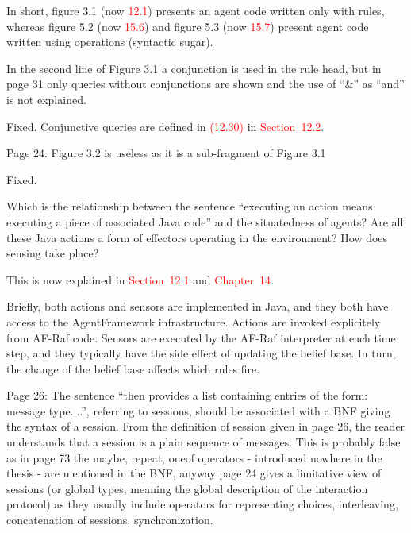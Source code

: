\documentclass{article}
\newcommand*\R[1]{\textcolor{red}{#1}} %
\newenvironment{them}{\noindent\begingroup\color{blue}}{\endgroup\par}
\begin{document}
In short, figure 3.1 (now \R{12.1}) presents an agent code written only with
rules, whereas figure 5.2 (now \R{15.6}) and figure 5.3 (now \R{15.7}) present
agent code written using operations (syntactic sugar).

\begin{them}

In the second line of Figure 3.1 a conjunction is used in the rule head, but in
page 31 only queries without conjunctions are shown and the use of ``\&'' as
``and'' is not explained.

\end{them}
Fixed.
Conjunctive queries are defined in \R{(12.30)} in \R{Section~12.2}.


\begin{them}

Page 24:
Figure 3.2 is useless as it is a sub-fragment of Figure 3.1
\end{them}
Fixed. 

\begin{them}

Which is the relationship between the sentence ``executing an action means
executing a piece of associated Java code'' and the situatedness of agents? Are
all these Java actions a form of effectors operating in the environment? How
does sensing take place?

\end{them}

This is now explained in \R{Section~12.1} and \R{Chapter~14}.

Briefly, both actions and sensors are implemented in Java,
  and they both have access to the AgentFramework infrastructure.
Actions are invoked explicitely from AF-Raf code.
Sensors are executed by the AF-Raf interpreter at each time step,
  and they typically have the side effect of updating the belief base.
In turn, the change of the belief base affects
  which rules fire.


\begin{them}

Page 26:
The sentence ``then provides a list containing entries of the form: message
type....'', referring to sessions, should be associated with a BNF giving the
syntax of a session. From the definition of session given in page 26, the
reader understands that a session is a plain sequence of messages. This is
probably false as in page 73 the maybe, repeat, oneof operators - introduced
nowhere in the thesis - are mentioned in the BNF, anyway page 24 gives a
limitative view of sessions (or global types, meaning the global description of
the interaction protocol) as they usually include operators for representing
choices, interleaving, concatenation of sessions, synchronization. 

\end{them}
\end{document}
